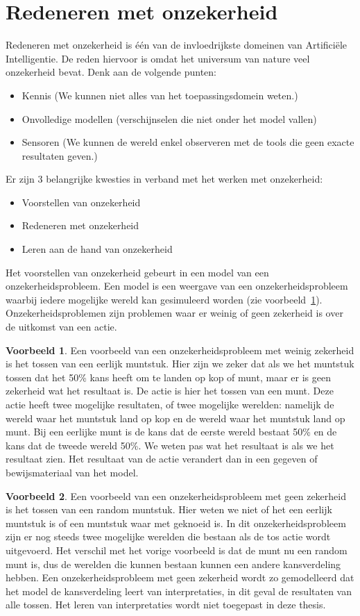 \documentclass[12pt,a4paper,oneside]{book}
\theoremstyle{definition}
\newtheorem{exmp}{Voorbeeld}[section]
\begin{document}
\section{Redeneren met onzekerheid}
Redeneren met onzekerheid is \'{e}\'{e}n van de invloedrijkste domeinen van Artifici\"{e}le Intelligentie. De reden hiervoor is omdat het universum van nature veel onzekerheid bevat. Denk aan de volgende punten:
\begin{itemize}
	\item Kennis (We kunnen niet alles van het toepassingsdomein weten.)
	\item Onvolledige modellen (verschijnselen die niet onder het model vallen)
	\item Sensoren (We kunnen de wereld enkel observeren met de tools die geen exacte resultaten geven.)
\end{itemize}
Er zijn 3 belangrijke kwesties in verband met het werken met onzekerheid:
\begin{itemize}
	\item Voorstellen van onzekerheid
	\item Redeneren met onzekerheid
	\item Leren aan de hand van onzekerheid
\end{itemize}
Het voorstellen van onzekerheid gebeurt in een model van een onzekerheidsprobleem. Een model is een weergave van een onzekerheidsprobleem waarbij iedere mogelijke wereld kan gesimuleerd worden (zie voorbeeld~\ref{exmp:faircoin}). Onzekerheidsproblemen zijn problemen waar er weinig of geen zekerheid is over de uitkomst van een actie.
\begin{exmp}
\label{exmp:faircoin}
Een voorbeeld van een onzekerheidsprobleem met weinig zekerheid is het tossen van een eerlijk muntstuk. Hier zijn we zeker dat als we het muntstuk tossen dat het 50\% kans heeft om te landen op kop of munt, maar er is geen zekerheid wat het resultaat is. De actie is hier het tossen van een munt. Deze actie heeft twee mogelijke resultaten, of twee mogelijke werelden: namelijk de wereld waar het muntstuk land op kop en de wereld waar het muntstuk land op munt. Bij een eerlijke munt is de kans dat de eerste wereld bestaat 50\% en de kans dat de tweede wereld 50\%. We weten pas wat het resultaat is als we het resultaat zien. Het resultaat van de actie verandert dan in een gegeven of bewijsmateriaal van het model.
\end{exmp}
\begin{exmp}
Een voorbeeld van een onzekerheidsprobleem met geen zekerheid is het tossen van een random muntstuk. Hier weten we niet of het een eerlijk muntstuk is of een muntstuk waar met geknoeid is. In dit onzekerheidsprobleem zijn er nog steeds twee mogelijke werelden die bestaan als de tos actie wordt uitgevoerd. Het verschil met het vorige voorbeeld is dat de munt nu een random munt is, dus de werelden die kunnen bestaan kunnen een andere kansverdeling hebben. Een onzekerheidsprobleem met geen zekerheid wordt zo gemodelleerd dat het model de kansverdeling leert van interpretaties, in dit geval de resultaten van alle tossen. Het leren van interpretaties wordt niet toegepast in deze thesis.
\end{exmp}
\end{document}
